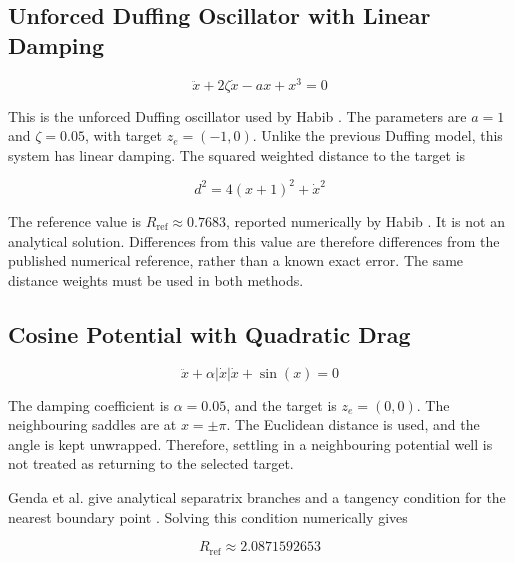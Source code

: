 \subsection{Unforced Duffing Oscillator with Linear Damping}

\begin{equation}
  \ddot{x} + 2\zeta \dot{x} - ax + {x}^{3} = 0
\end{equation}

\begin{revision}
This is the unforced Duffing oscillator used by Habib \cite[Section 4.1]{ref12}. The parameters are $a=1$ and $\zeta =0.05$, with target ${z}_{e}=(-1,0)$. Unlike the previous Duffing model, this system has linear damping. The squared weighted distance to the target is
\end{revision}

\begin{equation}
  d^{2} = 4(x+1)^{2} + \dot{x}^{2}
\end{equation}

The reference value is ${R}_{\mathrm{ref}}\approx 0.7683$, reported numerically by Habib \cite[Figure 1]{ref12}. It is not an analytical solution. Differences from this value are therefore differences from the published numerical reference, rather than a known exact error. The same distance weights must be used in both methods.

\subsection{Cosine Potential with Quadratic Drag}

\begin{equation}
  \ddot{x} + \alpha |\dot{x}|\dot{x} + \sin(x) = 0
\end{equation}

\begin{revision}
The damping coefficient is $\alpha =0.05$, and the target is ${z}_{e}=(0,0)$. The neighbouring saddles are at $x=\pm \pi $. The Euclidean distance is used, and the angle is kept unwrapped. Therefore, settling in a neighbouring potential well is not treated as returning to the selected target.
\end{revision}

Genda et al. give analytical separatrix branches and a tangency condition for the nearest boundary point \cite[Equations 26, 29, 34 and 37]{ref14}. Solving this condition numerically gives

\begin{equation}
  {R}_{\mathrm{ref}} \approx  2.0871592653
\end{equation}

